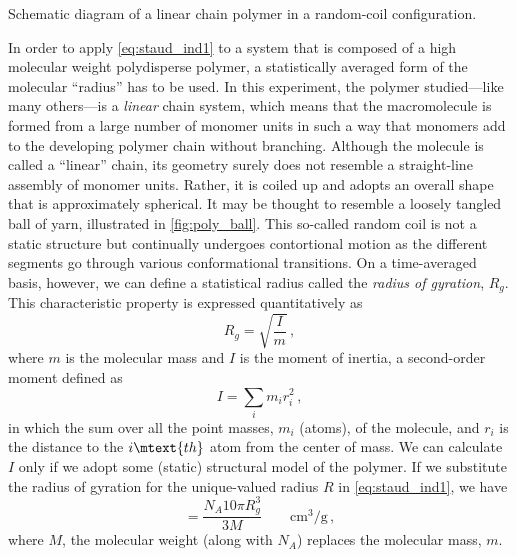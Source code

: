 \begin{marginfigure}
	\caption{Schematic diagram of a linear chain polymer in a random-coil configuration.}
	\label{fig:poly_ball}
\end{marginfigure}
In order to apply \cref{eq:staud_ind1} to a system that is composed of a high molecular weight polydisperse polymer, a statistically averaged form of the molecular ``radius'' has to be used. 
In this experiment, the polymer studied---like many others---is a \emph{linear} chain system, which means that the macromolecule is formed from a large number of monomer units in such a way that monomers add to the developing polymer chain without branching. 
Although the molecule is called a ``linear'' chain, its geometry surely does not resemble a straight-line assembly of monomer units. 
Rather, it is coiled up and adopts an overall shape that is approximately spherical. It may be thought to resemble a loosely tangled ball of yarn, illustrated in \cref{fig:poly_ball}.
This so-called random coil is not a static structure but continually undergoes contortional motion as the different segments go through various conformational transitions. 
On a time-averaged basis, however, we can define a statistical radius called the \emph{radius of gyration}, \( R_g \). 
This characteristic property is expressed quantitatively as
\begin{equation}
	R_g = \sqrt{\frac{I}{m}} \, ,
	\label{eq:rad_gyr}
\end{equation}
where \( m \) is the molecular mass and \( I \) is the moment of inertia, a second-order moment defined as
\begin{equation}
	I = \sum_i m_i r_i^2 \, ,
	\label{eq:mom_inert}
\end{equation}
in which the sum over all the point masses, \( m_i \) (atoms), of the molecule, and \( r_i \) is the distance to the \( i\mtext{th} \) atom from the center of mass. 
We can calculate \( I \) only if we adopt some (static) structural model of the polymer. 
If we substitute the radius of gyration for the unique-valued radius \( R \) in \cref{eq:staud_ind1}, we have
\begin{equation}
	[\eta] = \frac{N_A 10 \pi R_g^3}{3 M} \qquad \unit{\cm\cubed \per \g} \, ,
	\label{eq:staud_ind2}
\end{equation}
where \( M \), the molecular weight (along with \( N_A \)) replaces the molecular mass, \( m \).

